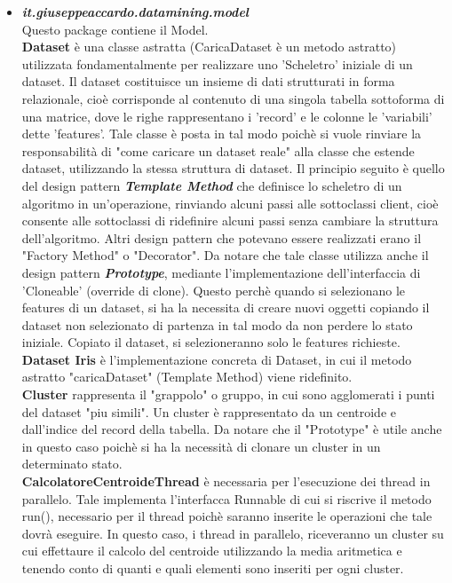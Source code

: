 \documentclass[a4paper, oneside]{book}
\begin{document}
\begin{itemize}
 \item \textit{\textbf{it.giuseppeaccardo.datamining.model}}\\
Questo package contiene il Model.\\ 
\textbf{Dataset} è una classe astratta (CaricaDataset è un metodo astratto) utilizzata fondamentalmente per realizzare uno 'Scheletro' iniziale di un dataset. Il dataset costituisce un insieme di dati strutturati in forma relazionale, cioè corrisponde al contenuto di una singola tabella sottoforma di una matrice, dove le righe rappresentano i 'record' e le colonne le 'variabili' dette 'features'. Tale classe è posta in tal modo poichè si vuole rinviare la responsabilità di "come caricare un dataset reale" alla classe che estende dataset, utilizzando la stessa struttura di dataset. Il principio seguito è quello del design pattern \textit{\textbf{Template Method}} che definisce lo scheletro di un algoritmo in un'operazione, rinviando alcuni passi alle sottoclassi client, cioè consente alle sottoclassi di ridefinire alcuni passi senza cambiare la struttura dell'algoritmo. Altri design pattern che potevano essere realizzati erano il "Factory Method" o "Decorator". Da notare che tale classe utilizza anche il design pattern \textit{\textbf{Prototype}}, mediante l'implementazione dell'interfaccia di 'Cloneable' (override di clone). Questo perchè quando si selezionano le features di un dataset, si ha la necessita di creare nuovi oggetti copiando il dataset non selezionato di partenza in tal modo da non perdere lo stato iniziale. Copiato il dataset, si selezioneranno solo le features richieste. \\
\textbf{Dataset Iris} è l'implementazione concreta di Dataset, in cui il metodo astratto "caricaDataset" (Template Method) viene ridefinito. \\
\textbf{Cluster} rappresenta il "grappolo" o gruppo, in cui sono agglomerati i punti del dataset "piu simili". Un cluster è rappresentato da un centroide e dall'indice del record della tabella. Da notare che il "Prototype" è utile anche in questo caso poichè si ha la necessità di clonare un cluster in un determinato stato.\\
\textbf{CalcolatoreCentroideThread} è necessaria per l'esecuzione dei thread in parallelo. Tale implementa l'interfacca Runnable di cui si riscrive il metodo run(), necessario per il thread poichè saranno inserite le operazioni che tale dovrà eseguire. In questo caso, i thread in parallelo, riceveranno un cluster su cui effettaure il calcolo del centroide utilizzando la media aritmetica e tenendo conto di quanti e quali elementi sono inseriti per ogni cluster.\\

\end{itemize}
\end{document}
